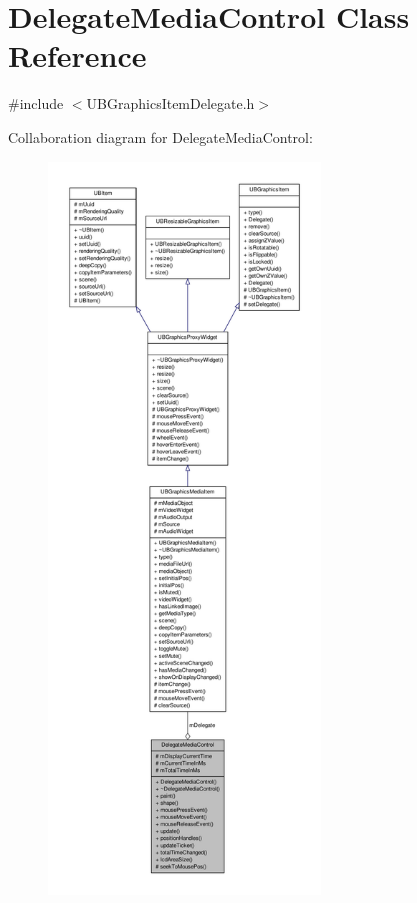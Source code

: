 \hypertarget{class_delegate_media_control}{\section{Delegate\-Media\-Control Class Reference}
\label{df/d0d/class_delegate_media_control}
}


{\ttfamily \#include $<$U\-B\-Graphics\-Item\-Delegate.\-h$>$}



Collaboration diagram for Delegate\-Media\-Control\-:
\nopagebreak
\begin{figure}[H]
\begin{center}
\leavevmode
\includegraphics[height=550pt]{dc/d79/class_delegate_media_control__coll__graph}
\end{center}
\end{figure}
